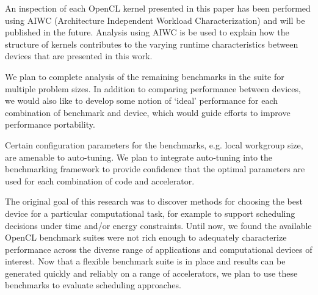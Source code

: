 \documentclass[../document.tex]{subfiles}
\begin{document}
\label{sec:future_work}

An inspection of each OpenCL kernel presented in this paper has been performed using AIWC (Architecture Independent Workload Characterization) and will be published in the future.
Analysis using AIWC is be used to explain how the structure of kernels contributes to the varying runtime characteristics between devices that are presented in this work.

We plan to complete analysis of the remaining benchmarks in the suite for multiple problem sizes.
In addition to comparing performance between devices, we would also like to develop some notion of `ideal' performance for each combination of benchmark and device, which would guide efforts to improve performance portability.

Certain configuration parameters for the benchmarks, e.g. local workgroup size, are amenable to auto-tuning.
We plan to integrate auto-tuning into the benchmarking framework to provide confidence that the optimal parameters are used for each combination of code and accelerator.

The original goal of this research was to discover methods for choosing the best device for a particular computational task, for example to support scheduling decisions under time and/or energy constraints.
Until now, we found the available OpenCL benchmark suites were not rich enough to adequately characterize performance across the diverse range of applications and computational devices of interest.
Now that a flexible benchmark suite is in place and results can be generated quickly and reliably on a range of accelerators, we plan to use these benchmarks to evaluate scheduling approaches.
\end{document}
